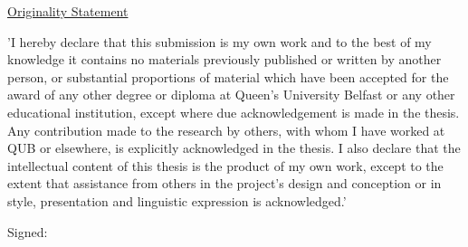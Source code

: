 
\begin{center}
  \begin{minipage}{13cm}
    \setlength{\parindent}{0cm}
    \setlength{\parskip}{2ex}
    {\underline{Originality Statement}}
    \par
    {\rmfamily\normalsize
    'I hereby declare that this submission is my own work and to the best of my  
    knowledge it contains no materials previously published or written by 
    another person, or substantial proportions of material which have been 
    accepted for the award of any other degree or diploma at Queen's University Belfast or any other 
    educational institution, except where due acknowledgement is made in the thesis. 
    Any contribution made to the research by others, with whom I have 
    worked at QUB or elsewhere, is explicitly acknowledged in the thesis. I 
    also declare that the intellectual content of this thesis is the product of my 
    own work, except to the extent that assistance from others in the project's 
    design and conception or in style, presentation and linguistic expression is 
    acknowledged.'
    }
    \par
    \vspace{1.5cm}
    {\rmfamily\normalsize \hspace{2cm}Signed:\hrulefill}
  \end{minipage}
\end{center}
\vfill\null